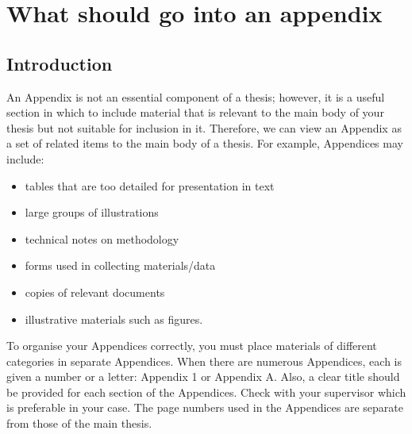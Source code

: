 \chapter{What should go into an appendix }\label{chapter:AppendixA}

\section{Introduction}
An Appendix is not an essential component of a thesis; however, it is a useful section in which to include material that is relevant to the main body of your thesis but not suitable for inclusion in it. Therefore, we can view an Appendix as a set of related items to the main body of a thesis. For example, Appendices may include:

\begin{itemize}
	\item tables that are too detailed for presentation in text
	\item large groups of illustrations
	\item technical notes on methodology
	\item forms used in collecting materials/data
	\item copies of relevant documents
	\item illustrative materials such as figures.
\end{itemize}

To organise your Appendices correctly, you must place materials of different categories in separate Appendices. When there are numerous Appendices, each is given a number or a letter: Appendix 1 or Appendix A. Also, a clear title should be provided for each section of the Appendices. Check with your supervisor which is preferable in your case. The page numbers used in the Appendices are separate from those of the main thesis.